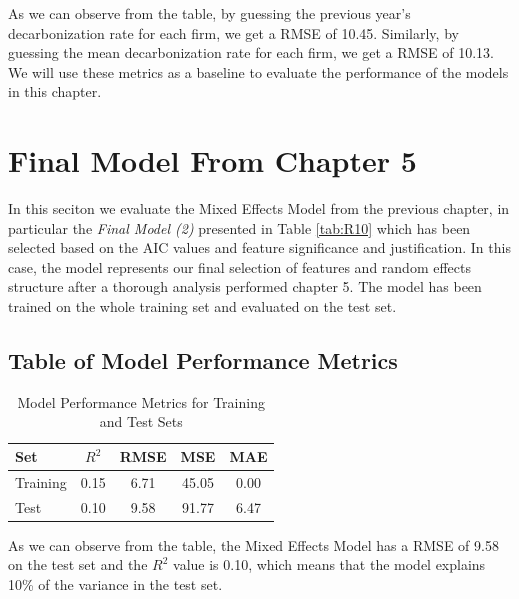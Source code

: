 

\noindent As we can observe from the table, by guessing the previous year's decarbonization rate for each firm, we get a RMSE of 10.45. Similarly, by guessing the mean decarbonization rate for each firm, we get a RMSE of 10.13. We will use these metrics as a baseline to evaluate the performance of the models in this chapter.

\section{Final Model From Chapter 5}
In this seciton we evaluate the Mixed Effects Model from the previous chapter, in particular the \textit{Final Model (2)} presented in Table \ref{tab:R10} which has been selected based on the AIC values and feature significance and justification. In this case, the model represents our final selection of features and random effects structure after a thorough analysis performed chapter 5. The model has been trained on the whole training set and evaluated on the test set.

\subsection{Table of Model Performance Metrics}
\begin{table}[H]
    \centering
    \caption{Model Performance Metrics for Training and Test Sets}
    \label{tab:model_performance}
    \begin{tabular}{lcccc}
    \hline
    Set & $R^2$ & RMSE & MSE & MAE \\ 
    \hline
    Training & 0.15 & 6.71 & 45.05 & 0.00 \\
    Test & 0.10 & 9.58 & 91.77 & 6.47 \\
    \hline
    \end{tabular}
\end{table}    

\noindent As we can observe from the table, the Mixed Effects Model has a RMSE of 9.58 on the test set and the $R^2$ value is 0.10, which means that the model explains 10\% of the variance in the test set. 
